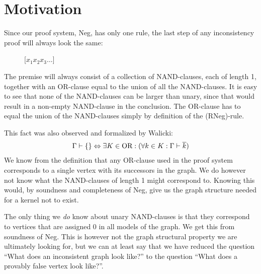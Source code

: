 \section{Motivation}
\label{sec:Motivation}
Since our proof system, Neg, has only one rule, the last step of any inconsistency proof will always look the same:\par
\begin{figure}[!h]
  \centering
  \begin{prooftree*}
    \Hypo{\dots}
    [$x_1x_2x_3\dots$]{\varnothing}
  \end{prooftree*}
  \caption{}
  \label{fig:proof_unary_nand}
\end{figure}
The premise will always consist of a collection of NAND-clauses, each of length 1, together with an OR-clause equal to the union of all the NAND-clauses.
It is easy to see that none of the NAND-clauses can be larger than unary, since that would result in a non-empty NAND-clause in the conclusion.
The OR-clause has to equal the union of the NAND-clauses simply by definition of the (RNeg)-rule.

This fact was also observed and formalized by Walicki\cite{michal-completeness}:
\begin{align}
  \Gamma \vdash \{\} \Leftrightarrow \exists K \in \text{OR}: (\forall  k \in K: \Gamma \vdash \ol{k})
\end{align}
We know from the definition that any OR-clause used in the proof system corresponds to a single vertex with its successors in the graph.
We do however not know what the NAND-clauses of length 1 might correspond to.
Knowing this would, by soundness and completeness of Neg, give us the graph structure needed for a kernel not to exist.

The only thing we \textit{do} know about unary NAND-clauses is that they correspond to vertices that are assigned 0 in all models of the graph.
We get this from soundness of Neg.
This is however not the graph structural property we are ultimately looking for, but we can at least say that we have reduced the question ``What does an inconsistent graph look like?'' to the question ``What does a provably false vertex look like?''.

